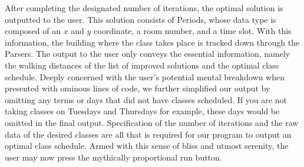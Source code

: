 \documentclass[11pt, oneside]{article}   	%
\newcommand{\rowstyle}[1]{\gdef\currentrowstyle{#1} #1\ignorespaces}
\begin{document}
\begin{table}[h]                                          %
\begin{center}
\end{center}
\caption{Time Slots and their corresponding time periods for classes at UBC Vancouver in Term 1 (T1) and Term 2 (T2).}
\label{timeslot}
\end{table}


After completing the designated number of iterations, the optimal solution is outputted to the user. This solution consists of Periods, whose data type is composed of an $x$ and $y$ coordinate, a room number, and a time slot. With this information, the building where the class takes place is tracked down through the Parsers. The output to the user only conveys the essential information, namely the walking distances of the list of improved solutions and the optimal class schedule. Deeply concerned with the user's potential mental breakdown when presented with ominous lines of code, we further simplified our output by omitting any terms or days that did not have classes scheduled. If you are not taking classes on Tuesdays and Thursdays for example, these days would be omitted in the final output. Specification of the number of iterations and the raw data of the desired classes are all that is required for our program to output an optimal class schedule. Armed with this sense of bliss and utmost serenity, the user may now press the mythically proportional run button. 
\end{document}
